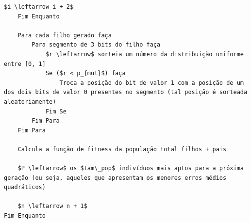 \documentclass{report}
\begin{document}
\begin{lstlisting}[style=pseudo-codigo]
		$i \leftarrow i + 2$
	Fim Enquanto
		
	Para cada filho gerado faça
		Para segmento de 3 bits do filho faça
			$r \leftarrow$ sorteia um número da distribuição uniforme entre [0, 1]
			Se ($r < p_{mut}$) faça
				Troca a posição do bit de valor 1 com a posição de um dos dois bits de valor 0 presentes no segmento (tal posição é sorteada aleatoriamente)
			Fim Se
		Fim Para
	Fim Para
		
	Calcula a função de fitness da população total filhos + pais
	
	$P \leftarrow$ os $tam\_pop$ indivíduos mais aptos para a próxima geração (ou seja, aqueles que apresentam os menores erros médios quadráticos)
	
	$n \leftarrow n + 1$
Fim Enquanto
	
\end{lstlisting}
\end{document}
